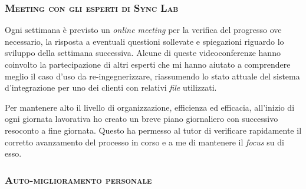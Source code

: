 
\subsubsection{\textsc{Meeting con gli esperti di Sync Lab}}

Ogni settimana è previsto un \textit{online meeting} per la verifica del progresso ove necessario, la risposta a eventuali questioni sollevate e spiegazioni riguardo lo sviluppo della settimana successiva.
Alcune di queste videoconferenze hanno coinvolto la partecipazione di altri esperti che mi hanno aiutato a comprendere meglio il caso d'uso da re-ingegnerizzare, riassumendo lo stato attuale del sistema d'integrazione per uno dei clienti con relativi \textit{file} utilizzati.

Per mantenere alto il livello di organizzazione, efficienza ed efficacia, all'inizio di ogni giornata lavorativa ho creato un breve piano giornaliero con successivo resoconto a fine giornata.
Questo ha permesso al tutor di verificare rapidamente il corretto avanzamento del processo in corso e a me di mantenere il \textit{focus} su di esso.

\subsubsection{\textsc{Auto-miglioramento personale}}
\label{subsub:auto-miglioramento}

